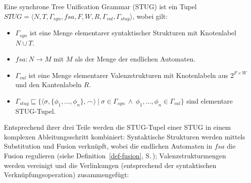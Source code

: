 \begin{definition} Eine synchrone Tree Unification Grammar (STUG) ist ein Tupel
$STUG = \langle N,T, \Gamma_{syn}, \mathit{fsa},F,W,R, \Gamma_{val}, \Gamma_{stug} \rangle$, wobei gilt:
\begin{itemize}
  \item $\Gamma_{syn}$ ist eine Menge elementarer syntaktischer Strukturen mit Knotenlabel $N \cup T$.
  \item $\mathit{fsa}: N \to M$ mit $M$ als der Menge der endlichen Automaten.
  \item $\Gamma_{val}$ ist eine Menge elementarer Valenzstrukturen mit Knotenlabeln aus $2^{F \times W}$ und den Kantenlabeln $R$.
  \item $\Gamma_{stug} \sqsubseteq \{\langle \sigma,\{\phi_1,\ldots,\phi_n\}, \frown\rangle \ | \ \sigma \in \Gamma_{syn} \ \wedge \ \phi_1,\ldots,\phi_n \in \Gamma_{val}\}$ sind elementare STUG-Tupel.  
\end{itemize}
\end{definition}
Entsprechend ihrer drei Teile werden die STUG-Tupel einer STUG in einem komplexen Ableitungsschritt kombiniert: Syntaktische Strukturen werden mittels Substitution und Fusion verknüpft, wobei die endlichen Automaten in $\mathit{fsa}$ die Fusion regulieren (siehe Definition~\ref{def-fusion}, S.\,\pageref{def-fusion}); Valenzstrukturmengen werden vereinigt und die Verlinkungen (entsprechend der syntaktischen Verknüpfungsoperation) zusammengefügt:


